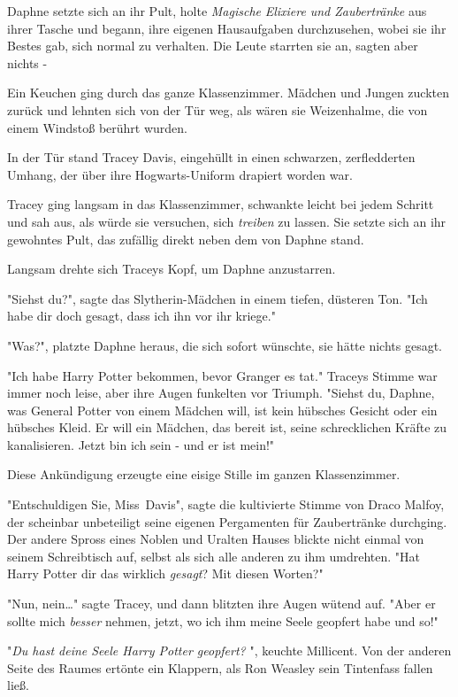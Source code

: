 {Daphne setzte sich an ihr Pult, holte \emph{Magische} \emph{Elixiere} \emph{und Zaubertränke} aus ihrer Tasche und begann, ihre eigenen Hausaufgaben durchzusehen, wobei sie ihr Bestes gab, sich normal zu verhalten. Die Leute starrten sie an, sagten aber nichts -

Ein Keuchen ging durch das ganze Klassenzimmer. Mädchen und Jungen zuckten zurück und lehnten sich von der Tür weg, als wären sie Weizenhalme, die von einem Windstoß berührt wurden.

In der Tür stand Tracey Davis, eingehüllt in einen schwarzen, zerfledderten Umhang, der über ihre Hogwarts-Uniform drapiert worden war.

Tracey ging langsam in das Klassenzimmer, schwankte leicht bei jedem Schritt und sah aus, als würde sie versuchen, sich \emph{treiben} zu lassen. Sie setzte sich an ihr gewohntes Pult, das zufällig direkt neben dem von Daphne stand.

Langsam drehte sich Traceys Kopf, um Daphne anzustarren.

"Siehst du?", sagte das Slytherin-Mädchen in einem tiefen, düsteren Ton. "Ich habe dir doch gesagt, dass ich ihn vor ihr kriege."

"Was?", platzte Daphne heraus, die sich sofort wünschte, sie hätte nichts gesagt.

"Ich habe Harry Potter bekommen, bevor Granger es tat." Traceys Stimme war immer noch leise, aber ihre Augen funkelten vor Triumph. "Siehst du, Daphne, was General Potter von einem Mädchen will, ist kein hübsches Gesicht oder ein hübsches Kleid. Er will ein Mädchen, das bereit ist, seine schrecklichen Kräfte zu kanalisieren. Jetzt bin ich sein - und er ist mein!"

Diese Ankündigung erzeugte eine eisige Stille im ganzen Klassenzimmer.

"Entschuldigen Sie, Miss~Davis", sagte die kultivierte Stimme von Draco Malfoy, der scheinbar unbeteiligt seine eigenen Pergamenten für Zaubertränke durchging. Der andere Spross eines Noblen und Uralten Hauses blickte nicht einmal von seinem Schreibtisch auf, selbst als sich alle anderen zu ihm umdrehten. "Hat Harry Potter dir das wirklich \emph{gesagt}? Mit diesen Worten?"

"Nun, nein…" sagte Tracey, und dann blitzten ihre Augen wütend auf. "Aber er sollte mich \emph{besser} nehmen, jetzt, wo ich ihm meine Seele geopfert habe und so!"

"\emph{Du hast deine Seele Harry Potter geopfert?} ", keuchte Millicent. Von der anderen Seite des Raumes ertönte ein Klappern, als Ron Weasley sein Tintenfass fallen ließ.

}
